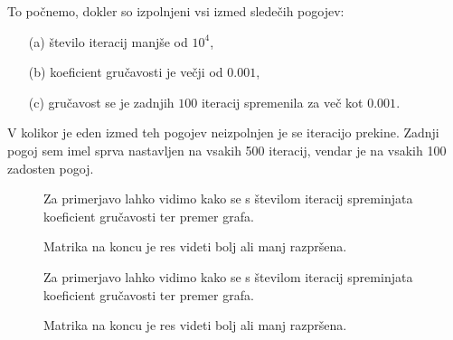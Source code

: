 \documentclass[12pt, a4paper]{article}
\begin{document}
To po\v cnemo, dokler so izpolnjeni vsi izmed slede\v cih pogojev:
\begin{itemize}
	\item[(a)]{\v stevilo iteracij manj\v se od $10^4$,}
	\item[(b)]{koeficient gru\v cavosti je ve\v cji od $0.001$,}
	\item[(c)]{gru\v cavost se je zadnjih $100$ iteracij spremenila za ve\v c kot $0.001$.}
\end{itemize}

V kolikor je eden izmed teh pogojev neizpolnjen je se iteracijo prekine. Zadnji pogoj sem imel sprva nastavljen na
vsakih 500 iteracij, vendar je na vsakih 100 zadosten pogoj.

\begin{figure}[H]\centering
	
	\caption{Za primerjavo lahko vidimo kako se s \v stevilom iteracij spreminjata koeficient gru\v cavosti
		ter premer grafa.}
	\label{fig:graph100}
\end{figure}

\begin{figure}[H]\centering
	
	\caption{Matrika na koncu je res videti bolj ali manj razpr\v sena.}
	\label{fig:mgraph100}
\end{figure}

\begin{figure}[H]\centering
	
	\caption{Za primerjavo lahko vidimo kako se s \v stevilom iteracij spreminjata koeficient gru\v cavosti
		ter premer grafa.}
	\label{fig:graph300}
\end{figure}

\begin{figure}[H]\centering
	
	\caption{Matrika na koncu je res videti bolj ali manj razpr\v sena.}
	\label{fig:mgraph300}
\end{figure}
\end{document}
